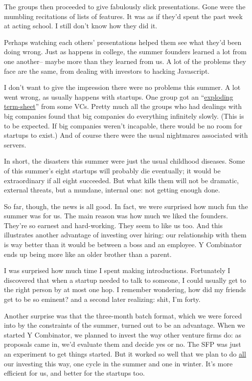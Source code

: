 The groups then proceeded to give fabulously slick presentations. Gone
were the mumbling recitations of lists of features. It was as if they'd
spent the past week at acting school. I still don't know how they did
it.

Perhaps watching each others' presentations helped them see what they'd
been doing wrong. Just as happens in college, the summer founders
learned a lot from one another-- maybe more than they learned from us. A
lot of the problems they face are the same, from dealing with investors
to hacking Javascript.

I don't want to give the impression there were no problems this summer.
A lot went wrong, as usually happens with startups. One group got an
``\href{http://www.ventureblog.com/articles/indiv/2003/000024.html}{exploding
term-sheet}'' from some VCs. Pretty much all the groups who had dealings
with big companies found that big companies do everything infinitely
slowly. (This is to be expected. If big companies weren't incapable,
there would be no room for startups to exist.) And of course there were
the usual nightmares associated with servers.

In short, the disasters this summer were just the usual childhood
diseases. Some of this summer's eight startups will probably die
eventually; it would be extraordinary if all eight succeeded. But what
kills them will not be dramatic, external threats, but a mundane,
internal one: not getting enough done.

So far, though, the news is all good. In fact, we were surprised how
much fun the summer was for us. The main reason was how much we liked
the founders. They're so earnest and hard-working. They seem to like us
too. And this illustrates another advantage of investing over hiring:
our relationship with them is way better than it would be between a boss
and an employee. Y Combinator ends up being more like an older brother
than a parent.

I was surprised how much time I spent making introductions. Fortunately
I discovered that when a startup needed to talk to someone, I could
usually get to the right person by at most one hop. I remember
wondering, how did my friends get to be so eminent? and a second later
realizing: shit, I'm forty.

Another surprise was that the three-month batch format, which we were
forced into by the constraints of the summer, turned out to be an
advantage. When we started Y Combinator, we planned to invest the way
other venture firms do: as proposals came in, we'd evaluate them and
decide yes or no. The SFP was just an experiment to get things started.
But it worked so well that we plan to do
\href{http://ycombinator.com/funding.html}{all} our investing this way,
one cycle in the summer and one in winter. It's more efficient for us,
and better for the startups too.

